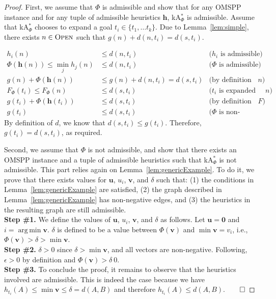 \documentclass[smallextended]{svjour3}       %
\newcommand{\omspp}{\ac{OMSPP}\xspace}
\newcommand{\kastarphi}{\textup{kA}$^*_{\Phi}$\xspace}
\newcommand{\open}{\textsc{Open}\xspace}
\newcommand{\axiomadm}{admissible\xspace}
\newcommand{\vect}[1]{\mathbf{#1}}
\DeclareMathOperator*{\argmin}{arg\,min}
\begin{document}




\admissibility*
\begin{proof}
  First, we assume that $\Phi$ is \axiomadm and show that for any \omspp instance and for any tuple of admissible heuristics $\vect{h}$, \kastarphi is admissible.
  Assume that \kastarphi chooses to expand a goal $t_i\in\{t_1,\ldots t_k\}$.
  Due to Lemma~\ref{lem:simple}, there exists $n\in \open$ such that $g(n) + d(n, t_i) = d(s, t_i)$.
	
  \begin{align}
  h_{i}(n) & \leq d(n,t_i) & \text{($h_{i}$ is admissible)}\\
  \Phi(\vect{h}(n)) \leq \min_{j} h_{j}(n) & \leq d(n, t_i) & \text{($\Phi$ is \axiomadm)}\\
  g(n) + \Phi(\vect{h}(n)) & \leq g(n) + d(n, t_i) = d(s, t_i) & \text{(by definition of $n$)}\\
  F_\Phi(t_i) \leq F_\Phi(n) & \leq d(s, t_i) & \text{($t_i$ is expanded before $n$)}\\
  g(t_i) + \Phi(\vect{h}(t_i)) & \leq d(s, t_i) & \text{(by definition of $F$)}\\
  g(t_i) & \leq d(s, t_i) & \text{($\Phi$ is non-negative)}
  \end{align}
  By definition of $d$, we know that $d(s,t_i)\leq g(t_i)$. 
  Therefore, $g(t_i)=d(s,t_i)$, as required.
  
  Second, we assume that $\Phi$ is not \axiomadm, and show that there exists an \omspp instance and a tuple of admissible heuristics such that \kastarphi is not admissible.
  This part relies again on Lemma~\ref{lem:genericExample}. 
  To do it, we prove that there exists values for $\vect{u}$, $u_i$, $\vect{v}$, and $\delta$ such that: (1) the conditions in Lemma~\ref{lem:genericExample} are satisfied, (2) the graph described in Lemma~\ref{lem:genericExample} has non-negative edges, and (3) the heuristics in the resulting graph are still admissible.\\
  \noindent \textbf{Step \#1.} We define the values of $\vect{u}$, $u_i$, $\vect{v}$, and $\delta$ as follows.
  Let $\vect{u} = \vect{0}$ and $i = \argmin \vect{v}$. $\delta$ is defined to be a value between $\Phi(\vect{v})$ and $\min \vect{v} = v_i$, i.e., $\Phi(\vect{v}) > \delta > \min \vect{v}$.\\
  \noindent \textbf{Step \#2.} $\delta>0$ since $\delta > \min \vect{v}$, and all vectors are non-negative. Following, $\epsilon>0$ by definition and $\Phi(\vect{v})>\delta\>0$.\\
  \noindent \textbf{Step \#3.} To conclude the proof, it remains to observe that the heuristics involved are admissible. This is indeed the case because we have $h_{t_i}(A) \leq \min \vect{v} \leq \delta = d(A, B)$ and therefore $h_{t_i}(A) \leq d(A, B)$.$\qed$
\end{proof}
\end{document}
